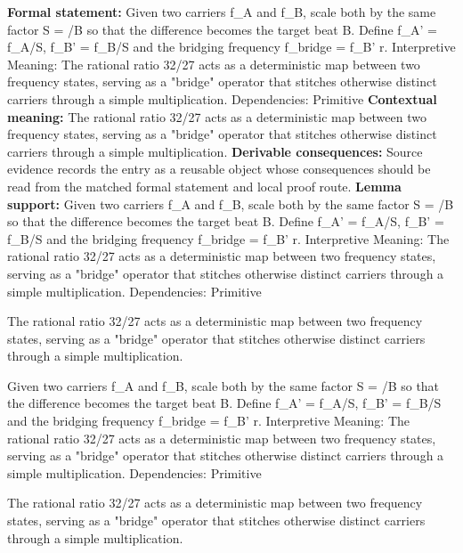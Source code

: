 \begingroup\footnotesize\setlength{\emergencystretch}{3em}\sloppy
\textbf{Formal statement:} Given two carriers f\_A and f\_B, scale both by the same factor S =  /B so that the difference becomes the target beat B. Define f\_A' = f\_A/S, f\_B' = f\_B/S and the bridging frequency f\_bridge = f\_B'   r. Interpretive Meaning: The rational ratio 32/27 acts as a deterministic map between two frequency states, serving as a "bridge" operator that stitches otherwise distinct carriers through a simple multiplication. Dependencies: Primitive
\textbf{Contextual meaning:} The rational ratio 32/27 acts as a deterministic map between two frequency states, serving as a "bridge" operator that stitches otherwise distinct carriers through a simple multiplication.
\textbf{Derivable consequences:} Source evidence records the entry as a reusable object whose consequences should be read from the matched formal statement and local proof route.
\textbf{Lemma support:} Given two carriers f\_A and f\_B, scale both by the same factor S =  /B so that the difference becomes the target beat B. Define f\_A' = f\_A/S, f\_B' = f\_B/S and the bridging frequency f\_bridge = f\_B'   r. Interpretive Meaning: The rational ratio 32/27 acts as a deterministic map between two frequency states, serving as a "bridge" operator that stitches otherwise distinct carriers through a simple multiplication. Dependencies: Primitive\par
\endgroup

The rational ratio 32/27 acts as a deterministic map between two frequency states, serving as a "bridge" operator that stitches otherwise distinct carriers through a simple multiplication.

Given two carriers f\_A and f\_B, scale both by the same factor S =  /B so that the difference becomes the target beat B. Define f\_A' = f\_A/S, f\_B' = f\_B/S and the bridging frequency f\_bridge = f\_B'   r. Interpretive Meaning: The rational ratio 32/27 acts as a deterministic map between two frequency states, serving as a "bridge" operator that stitches otherwise distinct carriers through a simple multiplication. Dependencies: Primitive

The rational ratio 32/27 acts as a deterministic map between two frequency states, serving as a "bridge" operator that stitches otherwise distinct carriers through a simple multiplication.
\endgroup

